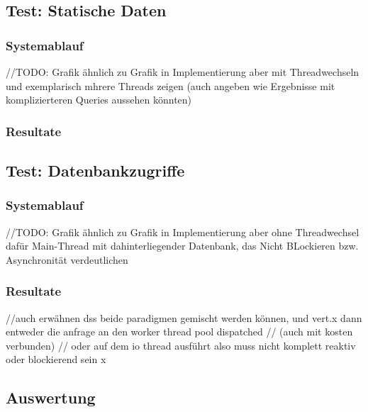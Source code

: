 \subsection{Test: Statische Daten}
\label{section:statische_daten}

\subsubsection{Systemablauf}
//TODO: Grafik ähnlich zu Grafik in Implementierung aber mit Threadwechseln und exemplarisch mhrere Threads zeigen
(auch angeben wie Ergebnisse mit komplizierteren Queries aussehen könnten)
\subsubsection{Resultate}

\subsection{Test: Datenbankzugriffe}
\label{section:datenbankzugriffe}

\subsubsection{Systemablauf}
//TODO: Grafik ähnlich zu Grafik in Implementierung aber ohne Threadwechsel dafür Main-Thread mit dahinterliegender Datenbank,
das Nicht BLockieren bzw. Asynchronität verdeutlichen

\subsubsection{Resultate}

//auch erwähnen dss beide paradigmen gemischt werden können, und vert.x dann entweder die anfrage an den worker thread pool dispatched
// (auch mit kosten verbunden)
// oder auf dem io thread ausführt also muss nicht komplett reaktiv oder blockierend sein x
\subsection{Auswertung}

\label{section:auswertung}